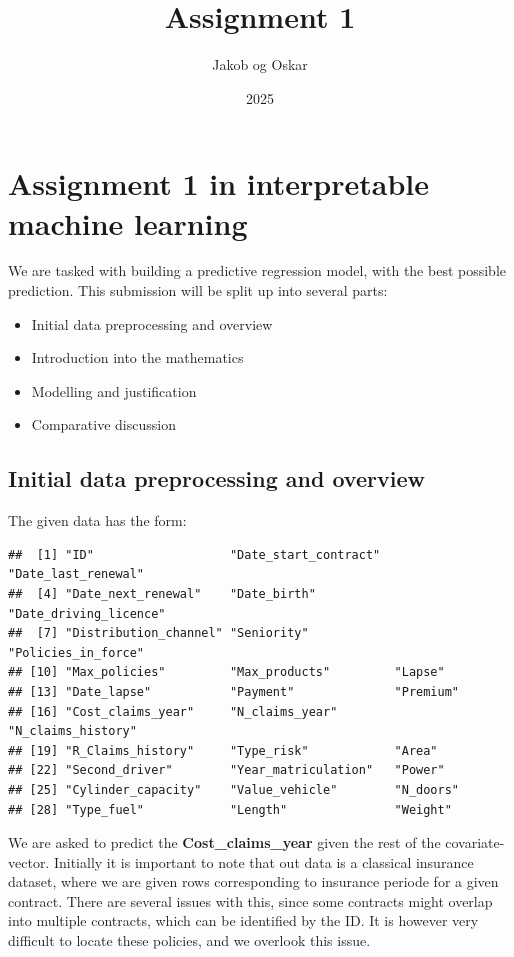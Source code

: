 \documentclass[
]{article}
\title{Assignment 1}
\author{Jakob og Oskar}
\date{2025}
\providecommand{\tightlist}{%
  \setlength{\itemsep}{0pt}\setlength{\parskip}{0pt}}
\begin{document}
\maketitle

\section{Assignment 1 in interpretable machine
learning}\label{assignment-1-in-interpretable-machine-learning}

We are tasked with building a predictive regression model, with the best
possible prediction. This submission will be split up into several
parts:

\begin{itemize}
\tightlist
\item
  Initial data preprocessing and overview
\item
  Introduction into the mathematics
\item
  Modelling and justification
\item
  Comparative discussion
\end{itemize}

\subsection{Initial data preprocessing and
overview}\label{initial-data-preprocessing-and-overview}

The given data has the form:

\begin{verbatim}
##  [1] "ID"                   "Date_start_contract"  "Date_last_renewal"   
##  [4] "Date_next_renewal"    "Date_birth"           "Date_driving_licence"
##  [7] "Distribution_channel" "Seniority"            "Policies_in_force"   
## [10] "Max_policies"         "Max_products"         "Lapse"               
## [13] "Date_lapse"           "Payment"              "Premium"             
## [16] "Cost_claims_year"     "N_claims_year"        "N_claims_history"    
## [19] "R_Claims_history"     "Type_risk"            "Area"                
## [22] "Second_driver"        "Year_matriculation"   "Power"               
## [25] "Cylinder_capacity"    "Value_vehicle"        "N_doors"             
## [28] "Type_fuel"            "Length"               "Weight"
\end{verbatim}

We are asked to predict the \textbf{Cost\_claims\_year} given the rest
of the covariate-vector. Initially it is important to note that out data
is a classical insurance dataset, where we are given rows corresponding
to insurance periode for a given contract. There are several issues with
this, since some contracts might overlap into multiple contracts, which
can be identified by the ID. It is however very difficult to locate
these policies, and we overlook this issue.
\end{document}
